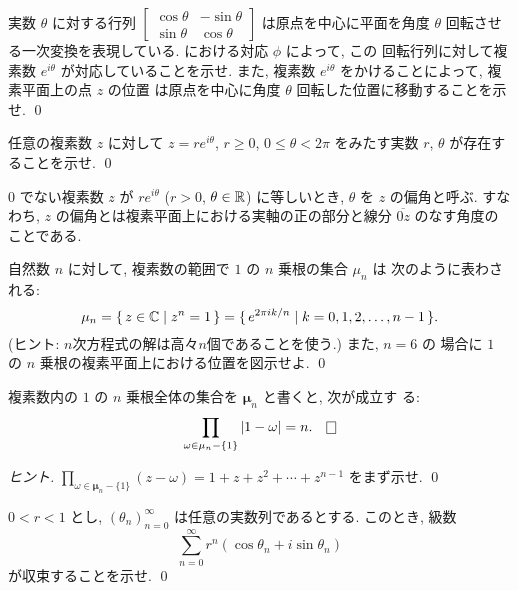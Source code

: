 \documentclass[12pt,twoside]{jarticle}
\begin{document}
\begin{question}\label{q:1-no-bekikon}
  実数 $\theta$ に対する行列
  \(
    \begin{bmatrix}
      \cos\theta & - \sin\theta \\
      \sin\theta &   \cos\theta
    \end{bmatrix}
  \) %
  は原点を中心に平面を角度 $\theta$ 回転させる一次変換を表現している.
  における対応 $\phi$ によって, この
  回転行列に対して複素数 $e^{i\theta}$ が対応していることを示せ. また, 
  複素数 $e^{i\theta}$ をかけることによって, 複素平面上の点 $z$ の位置
  は原点を中心に角度 $\theta$ 回転した位置に移動することを示せ. \qed
\end{question}

\begin{question}
  任意の複素数 $z$ に対して $z = r e^{i\theta}$, $r\ge0$,
  $0\le\theta<2\pi$ をみたす実数 $r$, $\theta$ が存在することを示せ. \qed
\end{question}

\noindent $0$ でない複素数 $z$ が $re^{i\theta}$ ($r>0$,
$\theta\in{\mathbb R}$) に等しいとき, $\theta$ を $z$ の偏角と呼ぶ. すなわち,
$z$ の偏角とは複素平面上における実軸の正の部分と線分 $\overline{0z}$ 
のなす角度のことである.

\begin{question}
  自然数 $n$ に対して, 複素数の範囲で $1$ の $n$ 乗根の集合 $\mu_n$ は
  次のように表わされる:
  \[
    \mathbf{\mu}_n
    =
    \{\, z\in{\mathbb C} \mid z^n = 1 \,\}
    =
    \{\, e^{2\pi ik/n} \mid k = 0,1,2,\dots,n-1 \,\}.
  \]%
  (ヒント: $n$次方程式の解は高々$n$個であることを使う.) また, $n=6$ の
  場合に $1$ の $n$ 乗根の複素平面上における位置を図示せよ. \qed
\end{question}

\begin{question}
  複素数内の $1$ の $n$ 乗根全体の集合を $\mathbf{\mu}_n$ と書くと, 次が成立す
  る:
  \[
    \prod_{\omega\in\bold{\mu}_n - \{1\}} |1 - \omega| = n. \qed
  \]%
\end{question}

\begin{proof}[ヒント]
 $\prod_{\omega\in\mathbf{\mu}_n - \{1\}}(z-\omega)=1+z+z^2+\cdots+z^{n-1}$
 をまず示せ.
 \qed
\end{proof}

\begin{question}[容易, 5点]
  $0<r<1$ とし, $(\theta_n)_{n=0}^\infty$ は任意の実数列であるとする. 
  このとき, 級数
  \[
    \sum_{n=0}^{\infty}r^n(\cos\theta_n+i\sin\theta_n)
  \] 
  が収束することを示せ. \qed
\end{question}
\end{document}
